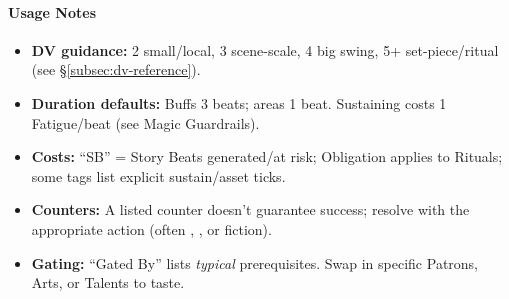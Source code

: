 \paragraph{Usage Notes}
\begin{itemize}
  \item \textbf{DV guidance:} 2 small/local, 3 scene-scale, 4 big swing, 5+ set-piece/ritual (see \S\ref{subsec:dv-reference}).
  \item \textbf{Duration defaults:} Buffs 3 beats; areas 1 beat. Sustaining costs 1 Fatigue/beat (see Magic Guardrails).
  \item \textbf{Costs:} “SB” = Story Beats generated/at risk; Obligation applies to Rituals; some tags list explicit sustain/asset ticks.
  \item \textbf{Counters:} A listed counter doesn’t guarantee success; resolve with the appropriate action (often , , or fiction).
  \item \textbf{Gating:} “Gated By” lists \emph{typical} prerequisites. Swap in specific Patrons, Arts, or Talents to taste.
\end{itemize}
